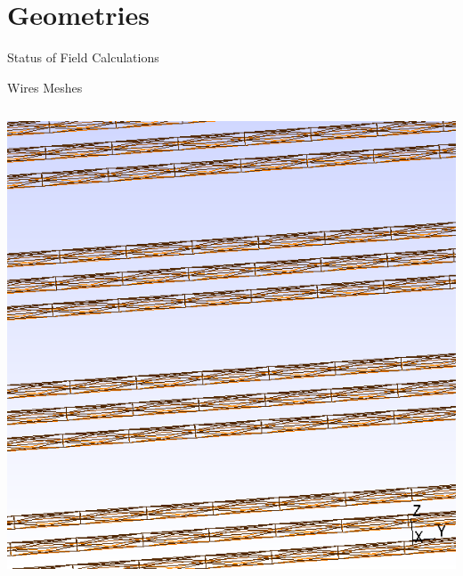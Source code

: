 \documentclass[xcolor=dvipsnames]{beamer}
\begin{document}
\section{Geometries}

\begin{frame}{Status of Field Calculations}
  \tableofcontents[currentsection]
\end{frame}

\begin{frame}{Wires Meshes}

  \footnotesize

  \begin{columns}
    \begin{column}{0.3\textwidth}
      \begin{center}
        \includegraphics[height=0.4\textheight]{parallel-mesh.png}      
        

\end{center}
\end{column}
\end{columns}
\end{frame}
\end{document}
